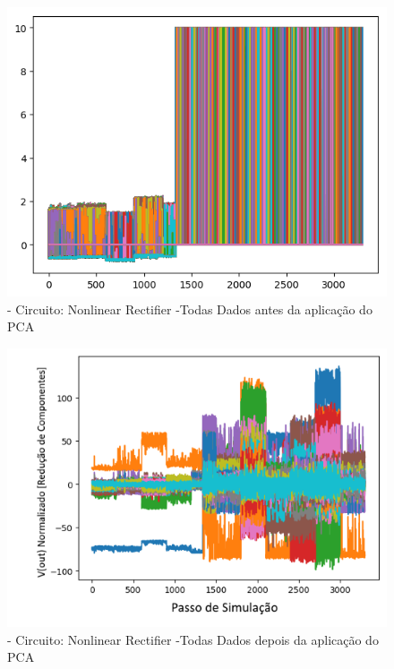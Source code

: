         \begin{figure}[H]
        \begin{center}
        \includegraphics[width=13cm]{./01_Pre_textuais/nonlin_figs/PAA_Nonlinear_Rectfier_+_4bit_PRBS_[FALHA]_-_300_-_02sraw.png}
        \caption{\label{fig:paaSalenkey}- Circuito: Nonlinear Rectifier -Todas Dados antes da aplicação do PCA}
        \end{center}
        \end{figure}
        
        
        \begin{figure}[H]
        \begin{center}
        \includegraphics[width=13cm]{./01_Pre_textuais/nonlin_figs/PCA_Nonlinear_Rectfier_+_4bit_PRBS_[FALHA]_-_300_-_02sraw.png}
        \caption{\label{fig:pcaSalenkey}- Circuito: Nonlinear Rectifier  -Todas Dados depois da aplicação do PCA}
        \end{center}
        \end{figure}
        
